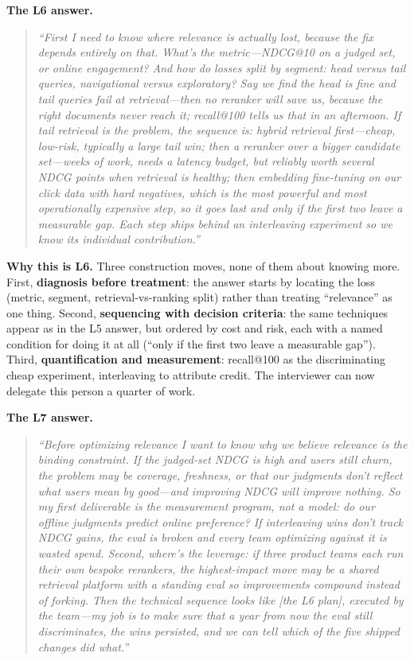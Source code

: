 \textbf{The L6 answer.}
\begin{quote}\itshape
``First I need to know where relevance is actually lost, because the fix depends entirely on that. What's the metric---NDCG@10 on a judged set, or online engagement? And how do losses split by segment: head versus tail queries, navigational versus exploratory? Say we find the head is fine and tail queries fail at retrieval---then no reranker will save us, because the right documents never reach it; recall@100 tells us that in an afternoon. If tail retrieval is the problem, the sequence is: hybrid retrieval first---cheap, low-risk, typically a large tail win; then a reranker over a bigger candidate set---weeks of work, needs a latency budget, but reliably worth several NDCG points when retrieval is healthy; then embedding fine-tuning on our click data with hard negatives, which is the most powerful and most operationally expensive step, so it goes last and only if the first two leave a measurable gap. Each step ships behind an interleaving experiment so we know its individual contribution.''
\end{quote}

\textbf{Why this is L6.} Three construction moves, none of them about knowing more. First, \textbf{diagnosis before treatment}: the answer starts by locating the loss (metric, segment, retrieval-vs-ranking split) rather than treating ``relevance'' as one thing. Second, \textbf{sequencing with decision criteria}: the same techniques appear as in the L5 answer, but ordered by cost and risk, each with a named condition for doing it at all (``only if the first two leave a measurable gap''). Third, \textbf{quantification and measurement}: recall@100 as the discriminating cheap experiment, interleaving to attribute credit. The interviewer can now delegate this person a quarter of work.

\textbf{The L7 answer.}
\begin{quote}\itshape
``Before optimizing relevance I want to know why we believe relevance is the binding constraint. If the judged-set NDCG is high and users still churn, the problem may be coverage, freshness, or that our judgments don't reflect what users mean by good---and improving NDCG will improve nothing. So my first deliverable is the measurement program, not a model: do our offline judgments predict online preference? If interleaving wins don't track NDCG gains, the eval is broken and every team optimizing against it is wasted spend. Second, where's the leverage: if three product teams each run their own bespoke rerankers, the highest-impact move may be a shared retrieval platform with a standing eval so improvements compound instead of forking. Then the technical sequence looks like [the L6 plan], executed by the team---my job is to make sure that a year from now the eval still discriminates, the wins persisted, and we can tell which of the five shipped changes did what.''
\end{quote}

